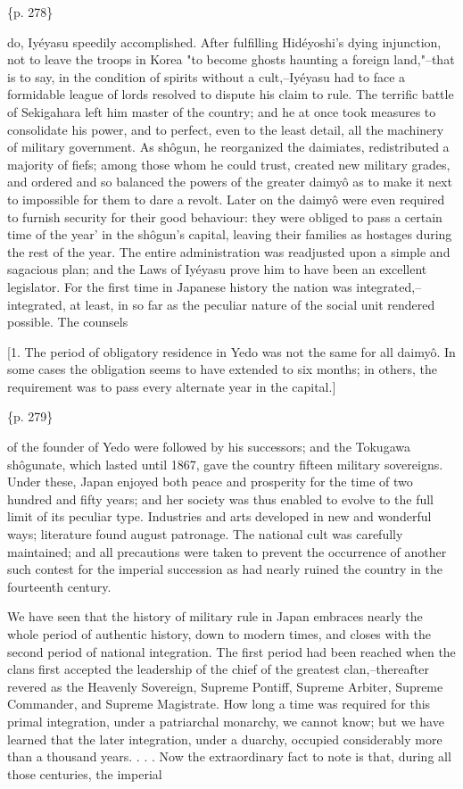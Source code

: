 \{p. 278\}

do, Iyéyasu speedily accomplished. After fulfilling Hidéyoshi's dying injunction, not to leave the troops in Korea "to become ghosts haunting a foreign land,"--that is to say, in the condition of spirits without a cult,--Iyéyasu had to face a formidable league of lords resolved to dispute his claim to rule. The terrific battle of Sekigahara left him master of the country; and he at once took measures to consolidate his power, and to perfect, even to the least detail, all the machinery of military government. As shôgun, he reorganized the daimiates, redistributed a majority of fiefs; among those whom he could trust, created new military grades, and ordered and so balanced the powers of the greater daimyô as to make it next to impossible for them to dare a revolt. Later on the daimyô were even required to furnish security for their good behaviour: they were obliged to pass a certain time of the year' in the shôgun's capital, leaving their families as hostages during the rest of the year. The entire administration was readjusted upon a simple and sagacious plan; and the Laws of Iyéyasu prove him to have been an excellent legislator. For the first time in Japanese history the nation was integrated,--integrated, at least, in so far as the peculiar nature of the social unit rendered possible. The counsels

[1. The period of obligatory residence in Yedo was not the same for all daimyô. In some cases the obligation seems to have extended to six months; in others, the requirement was to pass every alternate year in the capital.]

\{p. 279\}

of the founder of Yedo were followed by his successors; and the Tokugawa shôgunate, which lasted until 1867, gave the country fifteen military sovereigns. Under these, Japan enjoyed both peace and prosperity for the time of two hundred and fifty years; and her society was thus enabled to evolve to the full limit of its peculiar type. Industries and arts developed in new and wonderful ways; literature found august patronage. The national cult was carefully maintained; and all precautions were taken to prevent the occurrence of another such contest for the imperial succession as had nearly ruined the country in the fourteenth century.



We have seen that the history of military rule in Japan embraces nearly the whole period of authentic history, down to modern times, and closes with the second period of national integration. The first period had been reached when the clans first accepted the leadership of the chief of the greatest clan,--thereafter revered as the Heavenly Sovereign, Supreme Pontiff, Supreme Arbiter, Supreme Commander, and Supreme Magistrate. How long a time was required for this primal integration, under a patriarchal monarchy, we cannot know; but we have learned that the later integration, under a duarchy, occupied considerably more than a thousand years. . . . Now the extraordinary fact to note is that, during all those centuries, the imperial

